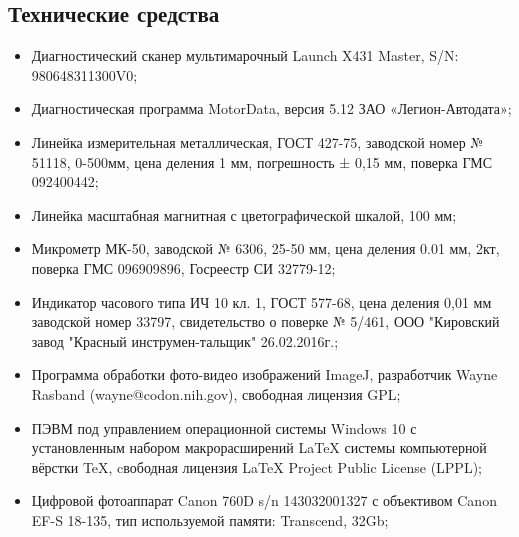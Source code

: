 \subsection{Технические средства}  %
\begin{itemize}
%    
\item 
Диагностический сканер мультимарочный Launch X431 Master, S/N: 980648311300V0;
\item 
Диагностическая программа MotorData, версия 5.12 ЗАО «Легион-Автодата»;
\item 	
Линейка измерительная металлическая, ГОСТ 427-75, заводской номер № 51118, 0-500мм, цена деления 1 мм, погрешность ± 0,15 мм, поверка ГМС 092400442;
\item 	
Линейка масштабная магнитная с цветографической шкалой, 100 мм;
\item 	
Микрометр МК-50, заводской № 6306, 25-50 мм, цена деления 0.01 мм, 2кт, поверка ГМС 096909896, Госреестр СИ 32779-12;
\item 	
Индикатор часового типа ИЧ 10 кл. 1, ГОСТ 577-68, цена деления 0,01 мм заводской номер 33797, свидетельство о поверке № 5/461, ООО "Кировский завод "Красный инструмен-тальщик" 26.02.2016г.;
\item   
Программа обработки фото-видео изображений ImageJ, разработчик  Wayne Rasband (wayne@codon.nih.gov),
свободная лицензия GPL;
\item   
ПЭВМ под управлением операционной системы Windows 10 с установленным набором макрорасширений LaTeX системы компьютерной вёрстки TeX, cвободная лицензия LaTeX Project Public License (LPPL);
\item 	
Цифровой фотоаппарат Canon 760D s/n 143032001327 с объективом Canon EF-S 18-135, тип используемой памяти: Transcend,  32Gb;

\end{itemize}

